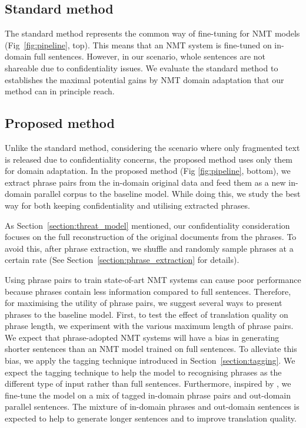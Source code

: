 \subsection{Standard method}

The standard method represents the common way of fine-tuning for NMT models (Fig~\ref{fig:pipeline}, top). This means that an NMT system is fine-tuned on in-domain full sentences. However, in our scenario, whole sentences are not shareable due to confidentiality issues. We evaluate the standard method to establishes the maximal potential gains by NMT domain adaptation that our method can in principle reach. 


\subsection{Proposed method}

Unlike the standard method, considering the scenario where only fragmented text is released due to confidentiality concerns, the proposed method uses only them for domain adaptation. 
In the proposed method (Fig \ref{fig:pipeline}, bottom), we extract phrase pairs from the in-domain original data and feed them as a new in-domain parallel corpus to the baseline model. While doing this, we study the best way for both keeping confidentiality and utilising extracted phrases. 

As Section~\ref{section:threat_model} mentioned, our confidentiality consideration focuses on the full reconstruction of the original documents from the phrases. To avoid this, after phrase extraction, we shuffle and randomly sample phrases at a certain rate (See Section~\ref{section:phrase_extraction} for details).

Using phrase pairs to train state-of-art NMT systems can cause poor performance because phrases contain less information compared to full sentences. Therefore, for maximising the utility of phrase pairs, we suggest several ways to present phrases to the baseline model. 
First, to test the effect of translation quality on phrase length, we experiment with the various maximum length of phrase pairs. We expect that phrase-adopted NMT systems will have a bias in generating shorter sentences than an NMT model trained on full sentences. To alleviate this bias, we apply the tagging technique introduced in Section~\ref{section:tagging}. We expect the tagging technique to help the model to recognising phrases as the different type of input rather than full sentences. Furthermore, inspired by \cite{chu-etal-2017-empirical}, we fine-tune the model on a mix of tagged in-domain phrase pairs and out-domain parallel sentences. The mixture of in-domain phrases and out-domain sentences is expected to help to generate longer sentences and to improve translation quality. 

